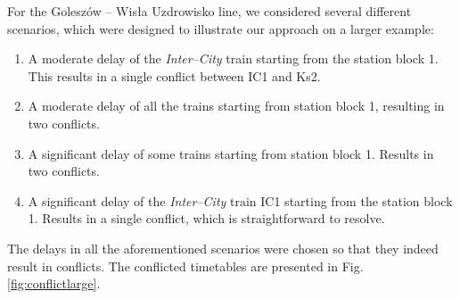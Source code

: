 For the Goleszów -- Wisła Uzdrowisko line, we considered several different scenarios, which were
designed to illustrate our approach on a larger example:

\begin{enumerate}
  \item A moderate delay of the \emph{Inter--City} train starting from the station
    block 1. This results in a single conflict between IC1 and Ks2.
  \item A moderate delay of all the trains starting from station block 1, resulting in two conflicts.
  \item A significant delay of some trains starting from station block 1. Results in two conflicts.
  \item A significant delay of the \emph{Inter--City} train IC1 starting from the station
    block 1. Results in a single conflict, which is straightforward to resolve.
\end{enumerate}

The delays in all the aforementioned scenarios were chosen so that they indeed
result in conflicts. The conflicted timetables are presented in Fig.
\ref{fig:conflictlarge}.

